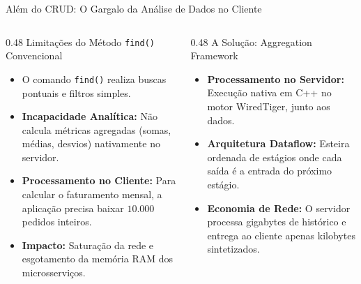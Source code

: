 \begin{frame}[fragile]{Além do CRUD: O Gargalo da Análise de Dados no Cliente}
  \vspace{0.1cm}
  \begin{columns}[t,onlytextwidth]
    \begin{column}{0.48\textwidth}
      \alert{Limitações do Método \texttt{find()} Convencional}\par
      \footnotesize
      \begin{itemize}
        \item O comando \lstinline[language=mongosh, basicstyle=\footnotesize\ttfamily]|find()| realiza buscas pontuais e filtros simples.
        \item \textbf{Incapacidade Analítica:} Não calcula métricas agregadas (somas, médias, desvios) nativamente no servidor.
        \item \textbf{Processamento no Cliente:} Para calcular o faturamento mensal, a aplicação precisa baixar $10.000$ pedidos inteiros.
        \item \textbf{Impacto:} Saturação da rede e esgotamento da memória RAM dos microsserviços.
      \end{itemize}
    \end{column}
    \begin{column}{0.48\textwidth}
      \alert{A Solução: Aggregation Framework}\par
      \footnotesize
      \begin{itemize}
        \item \textbf{Processamento no Servidor:} Execução nativa em C++ no motor WiredTiger, junto aos dados.
        \item \textbf{Arquitetura Dataflow:} Esteira ordenada de estágios onde cada saída é a entrada do próximo estágio.
        \item \textbf{Economia de Rede:} O servidor processa gigabytes de histórico e entrega ao cliente apenas kilobytes sintetizados.
      \end{itemize}
    \end{column}
  \end{columns}
\end{frame}

